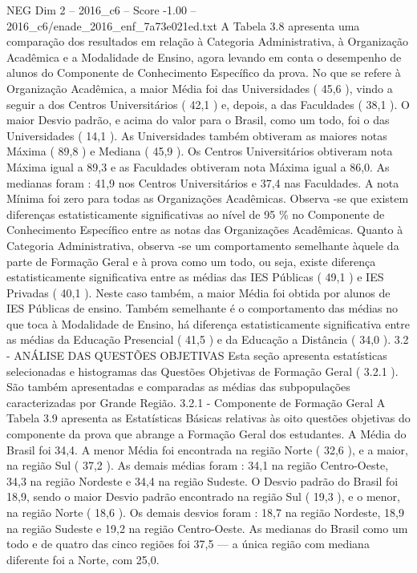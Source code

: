 \begin{textsample}{NEG Dim 2 – 2016\_c6 – Score -1.00 – 2016\_c6/enade\_2016\_enf\_7a73e021ed.txt}
A Tabela 3.8 apresenta uma comparação dos resultados em relação à Categoria Administrativa, à Organização Acadêmica e a Modalidade de Ensino, agora levando em conta o desempenho de alunos do Componente de Conhecimento Específico da prova.
No que se refere à Organização Acadêmica, a maior Média foi das Universidades ( 45,6 ), vindo a seguir a dos Centros Universitários ( 42,1 ) e, depois, a das Faculdades ( 38,1 ).
O maior Desvio padrão, e acima do valor para o Brasil, como um todo, foi o das Universidades ( 14,1 ).
As Universidades também obtiveram as maiores notas Máxima ( 89,8 ) e Mediana ( 45,9 ).
Os Centros Universitários obtiveram nota Máxima igual a 89,3 e as Faculdades obtiveram nota Máxima igual a 86,0.
As medianas foram : 41,9 nos Centros Universitários e 37,4 nas Faculdades.
A nota Mínima foi zero para todas as Organizações Acadêmicas.
Observa -se que existem diferenças estatisticamente significativas ao nível de 95 \% no Componente de Conhecimento Específico entre as notas das Organizações Acadêmicas.
Quanto à Categoria Administrativa, observa -se um comportamento semelhante àquele da parte de Formação Geral e à prova como um todo, ou seja, existe diferença estatisticamente significativa entre as médias das IES Públicas ( 49,1 ) e IES Privadas ( 40,1 ).
Neste caso também, a maior Média foi obtida por alunos de IES Públicas de ensino.
Também semelhante é o comportamento das médias no que toca à Modalidade de Ensino, há diferença estatisticamente significativa entre as médias da Educação Presencial ( 41,5 ) e da Educação a Distância ( 34,0 ). 3.2 - ANÁLISE DAS QUESTÕES OBJETIVAS Esta seção apresenta estatísticas selecionadas e histogramas das Questões Objetivas de Formação Geral ( 3.2.1 ).
São também apresentadas e comparadas as médias das subpopulações caracterizadas por Grande Região. 3.2.1 - Componente de Formação Geral A Tabela 3.9 apresenta as Estatísticas Básicas relativas às oito questões objetivas do componente da prova que abrange a Formação Geral dos estudantes.
A Média do Brasil foi 34,4.
A menor Média foi encontrada na região Norte ( 32,6 ), e a maior, na região Sul ( 37,2 ).
As demais médias foram : 34,1 na região Centro-Oeste, 34,3 na região Nordeste e 34,4 na região Sudeste.
O Desvio padrão do Brasil foi 18,9, sendo o maior Desvio padrão encontrado na região Sul ( 19,3 ), e o menor, na região Norte ( 18,6 ).
Os demais desvios foram : 18,7 na região Nordeste, 18,9 na região Sudeste e 19,2 na região Centro-Oeste.
As medianas do Brasil como um todo e de quatro das cinco regiões foi 37,5 — a única região com mediana diferente foi a Norte, com 25,0.

\end{textsample}
